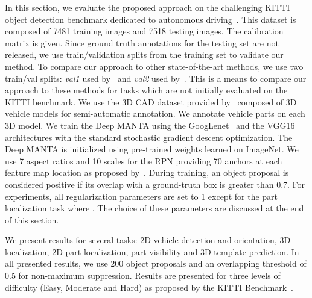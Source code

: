 \documentclass[10pt,twocolumn,letterpaper]{article}
\begin{document}
In this section, we evaluate the proposed approach on the challenging KITTI object detection benchmark dedicated to autonomous driving~\cite{kitti}. This dataset is composed of 7481 training images and 7518 testing images. The calibration matrix is given. Since ground truth annotations for the testing set are not released, we use train/validation splits from the training set to validate our method. To compare our approach to other state-of-the-art methods, we use two train/val splits: \textit{val1} used by~\cite{subcnn,3dvp} and \textit{val2} used by~\cite{3dop,mono3d}. This is a means to compare our approach to these methods for tasks which are not initially evaluated on the KITTI benchmark. We use the 3D CAD dataset provided by~\cite{cuboid,MTurkers} composed of  3D vehicle models for semi-automatic annotation. We annotate  vehicle parts on each 3D model. We train the Deep MANTA using the GoogLenet~\cite{gn} and the VGG16~\cite{vgg} architectures with the standard stochastic gradient descent optimization. The Deep MANTA is initialized using pre-trained weights learned on ImageNet. We use 7 aspect ratios and 10 scales for the RPN providing 70 anchors at each feature map location as proposed by~\cite{subcnn}. During training, an object proposal is considered positive if its overlap with a ground-truth box is greater than 0.7. For experiments, all regularization parameters  are set to 1 except for the part localization task where . The choice of these parameters are discussed at the end of this section.

We present results for several tasks: 2D vehicle detection and orientation, 3D localization, 2D part localization, part visibility and 3D template prediction. In all presented results, we use 200 object proposals and an overlapping threshold of 0.5 for non-maximum suppression. Results are presented for three levels of difficulty (Easy, Moderate and Hard) as proposed by the KITTI Benchmark~\cite{kitti}.
\end{document}
